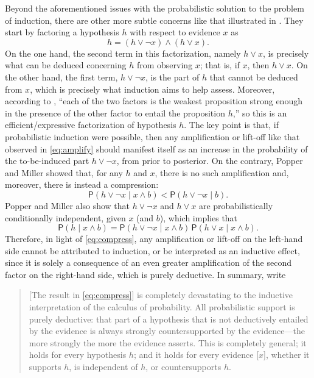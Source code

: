 \documentclass[a4paper, 12pt]{article}
\theoremstyle{plain}
\theoremstyle{definition}
\theoremstyle{remark}
\newcommand{\prob}{\mathsf{P}}
\begin{document}
Beyond the aforementioned issues with the probabilistic solution to the problem of induction, there are other more subtle concerns like that  illustrated in \citet{popper.miller.1983, popper.miller.1987}.  They start by factoring a hypothesis $h$ with respect to evidence $x$ as 
\begin{equation}
\label{eq:factor}
h = (h \lor \neg x) \land (h \lor x). 
\end{equation}
On the one hand, the second term in this factorization, namely $h \lor x$, is precisely what can be deduced concerning $h$ from observing $x$; that is, if $x$, then $h \lor x$.  On the other hand, the first term, $h \lor \neg x$, is the part of $h$ that cannot be deduced from $x$, which is precisely what induction aims to help assess.  Moreover, according to \citet[][p.~687]{popper.miller.1983}, ``each of the two factors is the weakest proposition strong enough in the presence of the other factor to entail the proposition $h$,'' so this is an efficient/expressive factorization of hypothesis $h$.  The key point is that, if probabilistic induction were possible, then any amplification or lift-off like that observed in \eqref{eq:amplify} should manifest itself as an increase in the probability of the to-be-induced part $h \lor \neg x$, from prior to posterior.  On the contrary, Popper and Miller showed that, for any $h$ and $x$, there is no such amplification and, moreover, there is instead a compression:
\begin{equation}
\label{eq:compress}
\prob(h \lor \neg x \mid x \land b) < \prob(h \lor \neg x \mid b). 
\end{equation}
Popper and Miller also show that $h \lor \neg x$ and $h \lor x$ are probabilistically conditionally independent, given $x$ (and $b$), which implies that 
\[ \prob(h \mid x \land b) = \prob(h \lor \neg x \mid x \land b) \, \prob(h \lor x \mid x \land b). \]
Therefore, in light of \eqref{eq:compress}, any amplification or lift-off on the left-hand side cannot be attributed to induction, or be interpreted as an inductive effect, since it is solely a consequence of an even greater amplification of the second factor on the right-hand side, which is purely deductive.  In summary, \citet[p.~688]{popper.miller.1983} write 
\begin{quote}
[The result in \eqref{eq:compress}] is completely devastating to the inductive interpretation of the calculus of probability. All probabilistic support is purely deductive: that part of a hypothesis that is not deductively entailed by the evidence is always strongly countersupported by the evidence---the more strongly the more the evidence asserts. This is completely general; it holds for every hypothesis
$h$; and it holds for every evidence [$x$], whether it supports $h$, is independent of $h$, or countersupports $h$. 
\end{quote}
\end{document}

